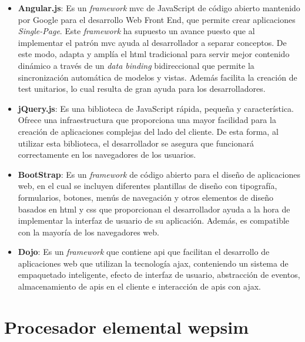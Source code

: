 \begin{itemize}

\item \textbf{Angular.js}: Es un \emph{\gls{framework}} \acrfull{mvc} de JavaScript de código abierto mantenido por Google para el desarrollo Web Front End, que permite crear aplicaciones \textit{Single-Page}. Este \emph{\gls{framework}} ha supuesto un avance puesto que al implementar el patrón \acrshort{mvc} ayuda al desarrollador a separar conceptos. De este modo, adapta y amplía el \acrshort{html} tradicional para servir mejor contenido dinámico a través de un \textit{data binding} bidireccional que permite la sincronización automática de modelos y vistas. Además facilita la creación de test unitarios, lo cual resulta de gran ayuda para los desarrolladores.

\item \textbf{jQuery.js}: Es una biblioteca de JavaScript rápida, pequeña y característica. Ofrece una infraestructura que proporciona una mayor facilidad para la creación de aplicaciones complejas del lado del cliente. De esta forma, al utilizar esta biblioteca, el desarrollador se asegura que funcionará correctamente en los navegadores de los usuarios.

\item \textbf{BootStrap}: Es un \emph{\gls{framework}} de código abierto para el diseño de aplicaciones web, en el cual se incluyen diferentes plantillas de diseño con tipografía, formularios, botones, menús de navegación y otros elementos de diseño basados en \acrshort{html} y \acrshort{css} que proporcionan el desarrollador ayuda a la hora de implementar la interfaz de usuario de su aplicación. Además, es compatible con la mayoría de los navegadores web.

\item \textbf{Dojo}: Es un \emph{\gls{framework}} que contiene \acrfull{api} que facilitan el desarrollo de aplicaciones web que utilizan la tecnología \acrfull{ajax}, conteniendo un sistema de empaquetado inteligente, efecto de interfaz de usuario, abstracción de eventos, almacenamiento de \acrshort{api}s en el cliente e interacción de \acrshort{api}s con \acrshort{ajax}.

\end{itemize}

\section{Procesador elemental \acrshort{wepsim}}
\label{sec:wepsim}

